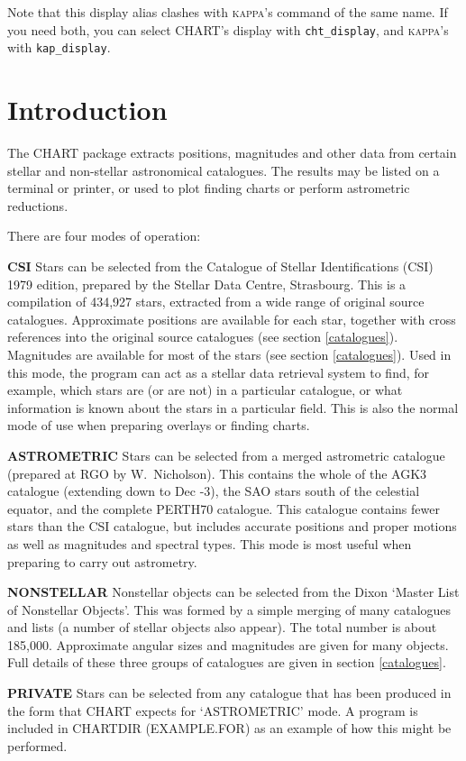 \documentclass{article}
\begin{document}
Note that this display alias clashes with \textsc{kappa}'s command of
the same name.  If you need both, you can select CHART's
display with \texttt{cht\_display}, and \textsc{kappa}'s with
\texttt{kap\_display}.


\section{Introduction}

The CHART package extracts positions, magnitudes and other data from certain
stellar and non-stellar astronomical catalogues.
The results may be listed on a terminal or printer, or used to plot finding
charts or perform astrometric reductions.

There are four modes of operation:
\begin{list}{}{\setlength{\leftmargin}{20mm}
\setlength{\labelsep}{5mm}
\setlength{\labelwidth}{5mm}
}
\item[{\bf CSI}]
Stars can be selected from the Catalogue of Stellar Identifications (CSI) 1979
edition, prepared by the Stellar Data Centre, Strasbourg.
This is a compilation of 434,927 stars, extracted from a wide range of original
source catalogues.
Approximate positions are available for each star, together with cross
references into the original source catalogues (see section \ref{catalogues}).
Magnitudes are available for most of the stars (see section \ref{catalogues}).
Used in this mode, the program can act as a stellar data retrieval system to
find, for example, which stars are (or are not) in a particular catalogue, or
what information is known about the stars in a particular field.
This is also the normal mode of use when preparing overlays or finding charts.
\item[{\bf ASTROMETRIC}]
Stars can be selected from a merged astrometric catalogue (prepared at RGO by
W.~Nicholson).
This contains the whole of the AGK3 catalogue (extending down to Dec -3), the
SAO stars south of the celestial equator, and the complete PERTH70 catalogue.
This catalogue contains fewer stars than the CSI catalogue, but includes
accurate positions and proper motions as well as magnitudes and spectral types.
This mode is most useful when preparing to carry out astrometry.
\item[{\bf NONSTELLAR}]
Nonstellar objects can be selected from the Dixon `Master List of Nonstellar
Objects'.
This was formed by a simple merging of many catalogues and lists (a number of
stellar objects also appear).
The total number is about 185,000.
Approximate angular sizes and magnitudes are given for many objects.
Full details of these three groups of catalogues are given in section 
\ref{catalogues}.
\item[{\bf PRIVATE}]
Stars can be selected from any catalogue that has been produced in the form that
CHART expects for `ASTROMETRIC' mode.
A program is included in CHARTDIR (EXAMPLE.FOR) as an example of how this might
be performed.
\end{list}
\end{document}
